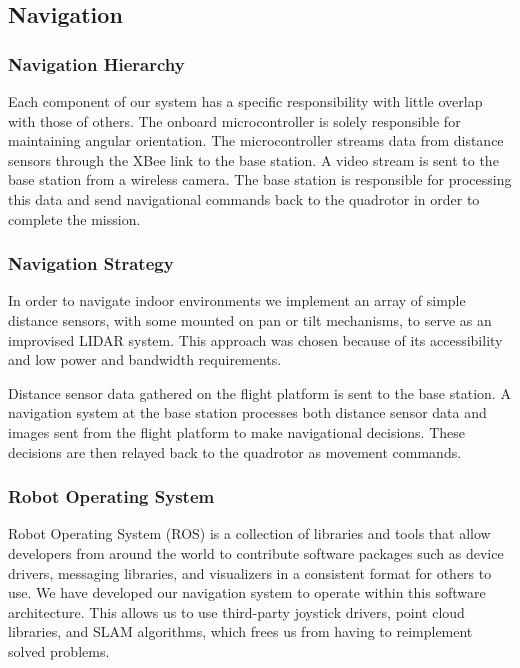 \documentclass[12pt,letterpaper]{article}
\begin{document}
\subsection*{Navigation}

\subsubsection*{Navigation Hierarchy}

Each component of our system has a specific responsibility with little overlap
with those of others. The onboard microcontroller is solely responsible for
maintaining angular orientation. The microcontroller streams data from distance
sensors through the XBee link to the base station. A video stream is sent to
the base station from a wireless camera. The base station is responsible for
processing this data and send navigational commands back to the quadrotor in
order to complete the mission.


\subsubsection*{Navigation Strategy}

In order to navigate indoor environments we implement an array of simple
distance sensors, with some mounted on pan or tilt mechanisms, to serve as an
improvised LIDAR system. This approach was chosen because of its accessibility
and low power and bandwidth requirements.

Distance sensor data gathered on the flight platform is sent to the base
station. A navigation system at the base station processes both distance sensor
data and images sent from the flight platform to make navigational decisions.
These decisions are then relayed back to the quadrotor as movement commands.


\subsubsection*{Robot Operating System}

Robot Operating System (ROS) is a collection of libraries and tools that allow
developers from around the world to contribute software packages such as device
drivers, messaging libraries, and visualizers in a consistent format for others
to use. We have developed our navigation system to operate within this software
architecture. This allows us to use third-party joystick drivers, point cloud
libraries, and SLAM algorithms, which frees us from having to reimplement
solved problems.
\end{document}
